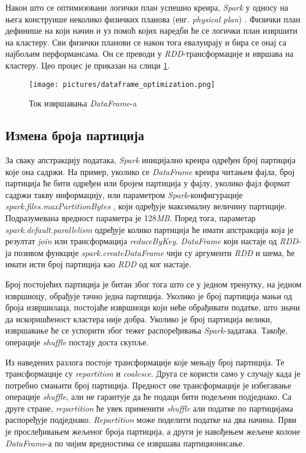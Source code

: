 \documentclass[12pt,oneside]{memoir}
\begin{document}
Након што се оптимизовани логички план успешно креира, \textit{Spark} у односу на њега конструише неколико физичких планова (енг. \textit{physical plan}) \cite{spark_guide}. Физички план дефинише на који начин и уз помоћ којих наредби ће се логички план извршити на кластеру. Сви физички планови се након тога евалуирају и бира се онај са најбољим перформансама. Он се преводи у \textit{RDD}-трансформације и ивршава на кластеру. Цео процес је приказан на слици \ref{fig:sprk_ex_plns}.

\begin{figure}[!ht]
  \centering
  \texttt{[image: pictures/dataframe\_optimization.png]}
  \caption{Ток извршавања \textit{DataFrame}-a}
  \label{fig:sprk_ex_plns}
\end{figure}

\subsection{Измена броја партиција}
\label{subsec:spark_repartition}

За сваку апстракцију података, \textit{Spark} иницијално креира одређен број партиција које она садржи. На пример, уколико се \textit{DataFrame} креира читањем фајла, број партиција ће бити одређен или бројем партиција у фајлу, уколико фајл формат садржи такву информацију, или параметром \textit{Spark}-конфигурације \textit{spark.files.maxPartitionBytes} \cite{spark_conf}, који одређује максималну величину партиције. Подразумевана вредност параметра је 128\textit{MB}. Поред тога, параметар \textit{spark.default.parallelism} \cite{spark_conf} одређује колико партиција ће имати апстракција која је резултат \textit{join} или трансформација \textit{reduceByKey}. \textit{DataFrame} који настаје од \textit{RDD}-ја позивом функције  \textit{spark.createDataFrame} чији су аргументи \textit{RDD} и шема, ће имати исти број партиција као \textit{RDD} од ког настаје.

Број постојећих партиција је битан због тога што се у једном тренутку, на једном извршиоцу, обрађује тачно једна партиција. Уколико је број партиција мањи од броја извршилаца, постојаће извршиоци који неће обрађивати податке, што значи да искоришћеност кластера није добра. Уколико је број партиција велики, извршавање ће се успорити због тежег распоређивања \textit{Spark}-задатака. Такође, операције \textit{shuffle} постају доста скупље. 

Из наведених разлога постоје трансформације које мењају број партиција. Те трансформације су \textit{repartition} и \textit{coalesce}. Друга се користи само у случају када је потребно смањити број партиција. Предност ове трансформације је избегавање операције \textit{shuffle}, али не гарантује да ће подаци бити подељени подједнако. Са друге стране, \textit{repartition} ће увек применити \textit{shuffle} али податке по партицијама распоређује подједнако. \textit{Repartition} може поделити податке на два начина. Први је прослеђивањем жељеног броја партиција, а други је навођењем жељене колоне \textit{DataFrame}-а по чијим вредностима се извршава партиционисање.
\end{document}
